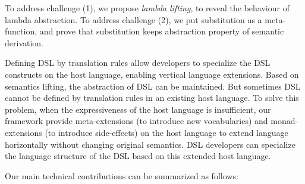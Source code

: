To address challenge (1),
 we propose \textit{lambda lifting}, to reveal the behaviour of lambda abstraction.
To address challenge (2),
 we put substitution as a meta-function, and prove that substitution keeps abstraction property of semantic derivation.

Defining DSL by translation rules allow developers to specialize the DSL constructs on the host language,
 enabling vertical language extensions.
Based on semantics lifting, the abstraction of DSL can be maintained.
But sometimes DSL cannot be defined by translation rules in an existing host language.
To solve this problem, when the expressiveness of the host language is insufficient, 
 our framework provide meta-extensions (to introduce new vocabularies) and monad-extensions (to introduce side-effects) on the host language
 to extend language horizontally without changing original semantics.
DSL developers can specialize the language structure of the DSL based on this extended host language.

Our main technical contributions can be summarized as follows:

